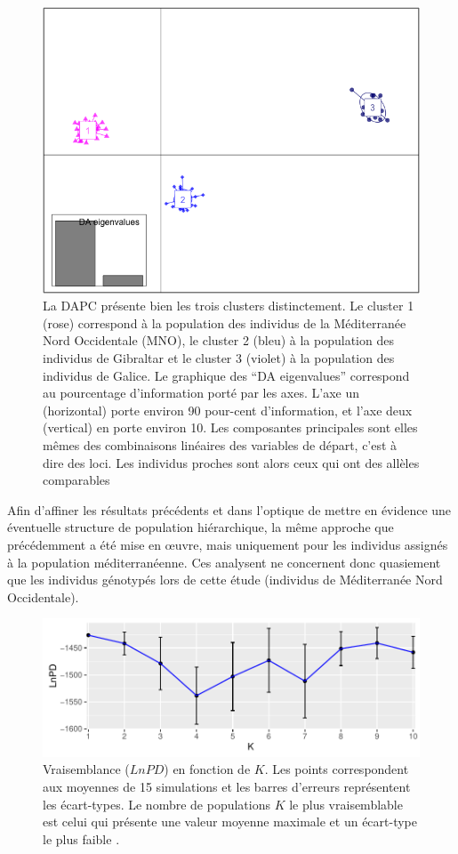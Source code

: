 \documentclass[a4paper,12pt,twoside]{article}\usepackage[]{graphicx}\usepackage[]{color}
\makeatletter
\def\maxwidth{ %
  \ifdim\Gin@nat@width>\linewidth
    \linewidth
  \else
    \Gin@nat@width
  \fi
}
\makeatother
\begin{document}
\begin{figure}[htbp]
	\centering
		\includegraphics[width=.7\textwidth]{DAPC}
	\caption{La DAPC présente bien les trois clusters distinctement. Le cluster 1 (rose) correspond à la population des individus de la Méditerranée Nord Occidentale (MNO), le cluster 2 (bleu) à la population des individus de Gibraltar et le cluster 3 (violet) à la population des individus de Galice. Le graphique des ``DA eigenvalues'' correspond au pourcentage d'information porté par les axes. L'axe un (horizontal) porte environ 90 pour-cent d'information, et l'axe deux (vertical) en porte environ 10. Les composantes principales sont elles mêmes des combinaisons linéaires des variables de départ, c'est à dire des loci. Les individus proches sont alors ceux qui ont des allèles comparables}
	\label{fig:DAPC}
\end{figure}


Afin d'affiner les résultats précédents et dans l'optique de mettre en évidence une éventuelle structure de population hiérarchique, la même approche que précédemment a été mise en \oe uvre, mais uniquement pour les individus assignés à la population méditerranéenne. Ces analysent ne concernent donc quasiement que les individus génotypés lors de cette étude (individus de Méditerranée Nord Occidentale).

\begin{figure}[htpb]

{\centering \includegraphics[width=\maxwidth]{figure/lnpd2-1} 

}

\caption[Vraisemblance ($LnPD$) en fonction de $K$.]{Vraisemblance ($LnPD$) en fonction de $K$. Les points correspondent aux moyennes de 15 simulations et les barres d'erreurs représentent les écart-types. Le nombre de populations $K$ le plus vraisemblable est celui qui présente une valeur moyenne maximale et un écart-type le plus faible \citep{pritchard2000}.}\label{fig:lnpd2}
\end{figure}
\end{document}
